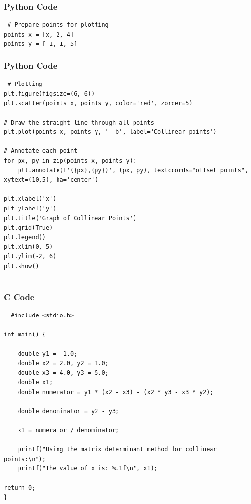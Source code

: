 \documentclass{beamer}
\begin{document}
\begin{frame}[fragile]
    \frametitle{Python Code}

    \begin{lstlisting}
 # Prepare points for plotting
points_x = [x, 2, 4]
points_y = [-1, 1, 5]

    \end{lstlisting}
\end{frame}

\begin{frame}[fragile]
    \frametitle{Python Code}

    \begin{lstlisting}
 # Plotting
plt.figure(figsize=(6, 6))
plt.scatter(points_x, points_y, color='red', zorder=5)

# Draw the straight line through all points
plt.plot(points_x, points_y, '--b', label='Collinear points')

# Annotate each point
for px, py in zip(points_x, points_y):
    plt.annotate(f'({px},{py})', (px, py), textcoords="offset points", xytext=(10,5), ha='center')

plt.xlabel('x')
plt.ylabel('y')
plt.title('Graph of Collinear Points')
plt.grid(True)
plt.legend()
plt.xlim(0, 5)
plt.ylim(-2, 6)
plt.show()


\end{lstlisting}
\end{frame}

 



 


\begin{frame}[fragile]
\frametitle{C Code}
\begin{lstlisting}
  #include <stdio.h>

int main() {

    double y1 = -1.0;
    double x2 = 2.0, y2 = 1.0;
    double x3 = 4.0, y3 = 5.0;
    double x1;
    double numerator = y1 * (x2 - x3) - (x2 * y3 - x3 * y2);

    double denominator = y2 - y3;

    x1 = numerator / denominator;

    printf("Using the matrix determinant method for collinear points:\n");
    printf("The value of x is: %.1f\n", x1);

return 0;
}





\end{lstlisting}

\end{frame}
\end{document}
